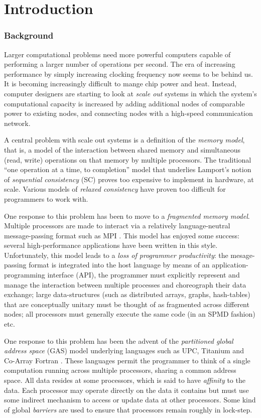 \chapter{Introduction}

\subsection*{Background}
Larger computational problems need more powerful computers capable of
performing a larger number of operations per second. The era of
increasing performance by simply increasing clocking frequency now
seems to be behind us. It is becoming increasingly difficult
to mange chip power and heat.  Instead, computer
designers are starting to look at {\em scale out} systems in which the
system's computational capacity is increased by adding additional
nodes of comparable power to existing nodes, and connecting nodes with
a high-speed communication network.

A central problem with scale out systems is a definition of the {\em
memory model}, that is, a model of the interaction between shared
memory and  simultaneous (read, write) operations on that
memory by multiple processors. The traditional ``one operation at a
time, to completion'' model that underlies Lamport's notion of {\em
sequential consistency} (SC) proves too expensive to implement in
hardware, at scale. Various models of {\em relaxed consistency} have
proven too difficult for programmers to work with.  

One response to this problem has been to move to a {\em fragmented
memory model}. Multiple processors are made to interact via a
relatively language-neutral message-passing format such as MPI
\cite{mpi}. This model has enjoyed some success: several
high-performance applications have been written in this
style. Unfortunately, this model leads to a {\em loss of programmer
productivity}: the mesage-passing format is integrated into the host
language by means of an application-programming interface (API), the
programmer must explicitly represent and manage the interaction
between multiple processes and choreograph their data exchange; large
data-structures (such as distributed arrays, graphs, hash-tables) that
are conceptually unitary must be thought of as fragmented across
different nodes; all processors must generally execute the same code
(in an SPMD fashion) etc.

One response to this problem has been the advent of the {\em
partitioned global address space} (GAS) model underlying languages
such as UPC, Titanium and Co-Array Fortran \cite{pgas,titanium}. These
languages permit the programmer to think of a single computation
running across multiple processors, sharing a common address
space. All data resides at some processors, which is said to have {\em
affinity} to the data.  Each processor may operate directly on the
data it contains but must use some indirect mechanism to access or
update data at other processors. Some kind of global {\em barriers}
are used to ensure that processors remain roughly in lock-step.

